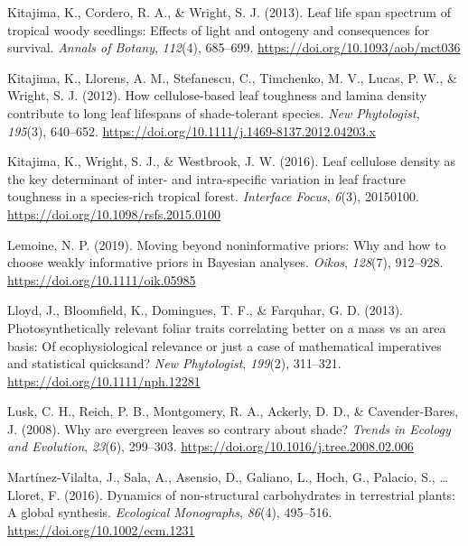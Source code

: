 \documentclass[
  12pt,
  letterpaper,
  DIV=11,
  numbers=noendperiod]{scrartcl}
\newlength{\cslhangindent}
\newlength{\cslentryspacingunit} %
\newenvironment{CSLReferences}[2] %
 {%
  \setlength{\parindent}{0pt}
  \ifodd #1
  \let\oldpar\par
  \def\par{\hangindent=\cslhangindent\oldpar}
  \fi
  \setlength{\parskip}{#2\cslentryspacingunit}
 }%
 {}
\begin{document}
\begin{CSLReferences}{1}{0}
\leavevmode{}%
Kitajima, K., Cordero, R. A., \& Wright, S. J. (2013). Leaf life span
spectrum of tropical woody seedlings: {Effects} of light and ontogeny
and consequences for survival. \emph{Annals of Botany}, \emph{112}(4),
685--699. \url{https://doi.org/10.1093/aob/mct036}

\leavevmode{}%
Kitajima, K., Llorens, A. M., Stefanescu, C., Timchenko, M. V., Lucas,
P. W., \& Wright, S. J. (2012). How cellulose-based leaf toughness and
lamina density contribute to long leaf lifespans of shade-tolerant
species. \emph{New Phytologist}, \emph{195}(3), 640--652.
\url{https://doi.org/10.1111/j.1469-8137.2012.04203.x}

\leavevmode{}%
Kitajima, K., Wright, S. J., \& Westbrook, J. W. (2016). Leaf cellulose
density as the key determinant of inter- and intra-specific variation in
leaf fracture toughness in a species-rich tropical forest.
\emph{Interface Focus}, \emph{6}(3), 20150100.
\url{https://doi.org/10.1098/rsfs.2015.0100}

\leavevmode{}%
Lemoine, N. P. (2019). Moving beyond noninformative priors: Why and how
to choose weakly informative priors in {Bayesian} analyses.
\emph{Oikos}, \emph{128}(7), 912--928.
\url{https://doi.org/10.1111/oik.05985}

\leavevmode{}%
Lloyd, J., Bloomfield, K., Domingues, T. F., \& Farquhar, G. D. (2013).
Photosynthetically relevant foliar traits correlating better on a mass
vs an area basis: {Of} ecophysiological relevance or just a case of
mathematical imperatives and statistical quicksand? \emph{New
Phytologist}, \emph{199}(2), 311--321.
\url{https://doi.org/10.1111/nph.12281}

\leavevmode{}%
Lusk, C. H., Reich, P. B., Montgomery, R. A., Ackerly, D. D., \&
Cavender-Bares, J. (2008). Why are evergreen leaves so contrary about
shade? \emph{Trends in Ecology and Evolution}, \emph{23}(6), 299--303.
\url{https://doi.org/10.1016/j.tree.2008.02.006}

\leavevmode{}%
Martínez-Vilalta, J., Sala, A., Asensio, D., Galiano, L., Hoch, G.,
Palacio, S., \ldots{} Lloret, F. (2016). Dynamics of non-structural
carbohydrates in terrestrial plants: A global synthesis.
\emph{Ecological Monographs}, \emph{86}(4), 495--516.
\url{https://doi.org/10.1002/ecm.1231}


\end{CSLReferences}
\end{document}
